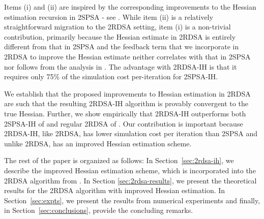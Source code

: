 \documentclass[letterpaper, 10 pt, conference]{ieeeconf}  %
\begin{document}
Items (i) and (ii) are inspired by the corresponding improvements to the Hessian estimation recursion in 2SPSA - see \cite{spall-jacobian}. While item (ii) is a relatively straightforward migration to the 2RDSA setting, item (i) is a non-trivial contribution, primarily because the Hessian estimate in 2RDSA is entirely different from that in 2SPSA and the feedback term that we incorporate in 2RDSA to improve the Hessian estimate neither correlates with that in 2SPSA nor follows from the analysis in \cite{spall-jacobian}. 
The advantage with 2RDSA-IH is that it requires only 75\% of the simulation cost per-iteration for 2SPSA-IH. 

We establish that the proposed improvements to Hessian estimation in 2RDSA are such  that the resulting 2RDSA-IH algorithm is provably convergent to the true Hessian. 
Further, we show empirically that 2RDSA-IH outperforms both 2SPSA-IH of \cite{spall-jacobian} and regular 2RDSA of \cite{prashanth2015rdsa}. Our contribution is important because 2RDSA-IH, like 2RDSA, has lower simulation cost per iteration than 2SPSA and unlike 2RDSA, has an improved Hessian estimation scheme.

The rest of the paper is organized as follows: In Section~\ref{sec:2rdsa-ih}, we
describe the improved Hessian estimation scheme, which is incorporated into the  2RDSA algorithm from \cite{prashanth2015rdsa}. In Section \ref{sec:2rdsa-results}, we present the theoretical results for the 2RDSA algorithm with  improved Hessian estimation.
In Section~\ref{sec:expts}, we present the results from numerical experiments and finally, in  Section~\ref{sec:conclusions}, provide the concluding remarks.
\end{document}
